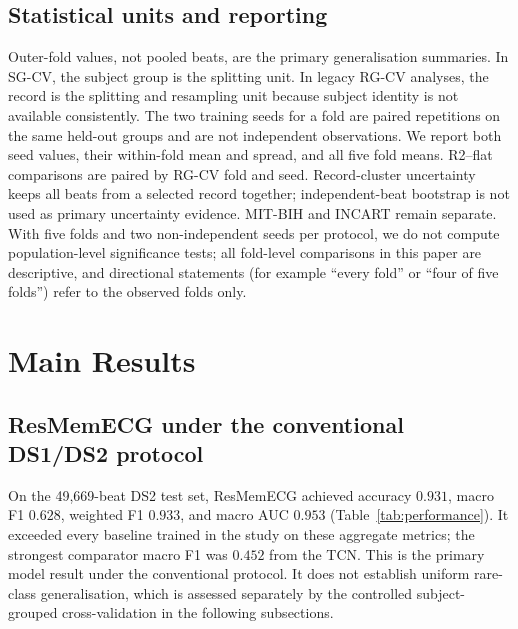 \documentclass[review,12pt]{elsarticle}
\begin{document}
\subsection{Statistical units and reporting}
Outer-fold values, not pooled beats, are the primary generalisation summaries.
In SG-CV, the subject group is the splitting unit. In legacy RG-CV analyses,
the record is the splitting and resampling unit because subject identity is not
available consistently. The two training seeds for a fold are paired repetitions
on the same held-out groups and are not independent observations. We report both
seed values, their within-fold mean and spread, and all five fold means. R2--flat
comparisons are paired by RG-CV fold and seed. Record-cluster uncertainty keeps
all beats from a selected record together; independent-beat bootstrap is not
used as primary uncertainty evidence. MIT-BIH and INCART remain separate. With
five folds and two non-independent seeds per protocol, we do not compute
population-level significance tests; all fold-level comparisons in this paper
are descriptive, and directional statements (for example ``every fold'' or
``four of five folds'') refer to the observed folds only.

\section{Main Results}
\subsection{ResMemECG under the conventional DS1/DS2 protocol}
On the 49,669-beat DS2 test set, ResMemECG achieved accuracy $0.931$, macro
F1 $0.628$, weighted F1 $0.933$, and macro AUC $0.953$
(Table~\ref{tab:performance}). It exceeded every baseline trained in the study
on these aggregate metrics; the strongest comparator macro F1 was $0.452$ from the
TCN. This is the primary model result under the conventional protocol. It does
not establish uniform rare-class generalisation, which is assessed separately
by the controlled subject-grouped cross-validation in the following subsections.
\end{document}
